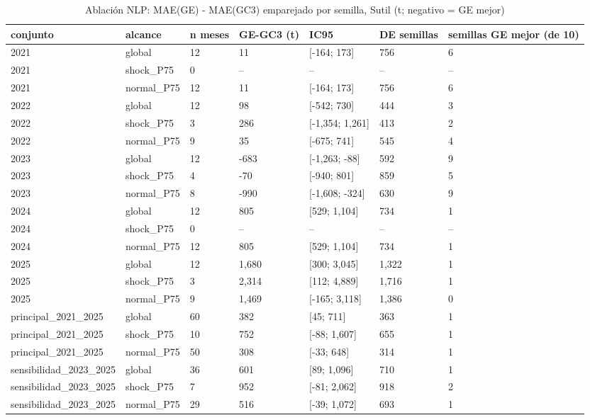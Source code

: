 \begin{table}[H]
\centering
\small
\caption{Ablación NLP: MAE(GE) - MAE(GC3) emparejado por semilla, Sutil (t; negativo = GE mejor)}
\label{tab:T11_ablacion_sutil}
\begin{tabular}{lllllll}
\toprule
conjunto & alcance & n meses & GE-GC3 (t) & IC95 & DE semillas & semillas GE mejor (de 10) \\
\midrule
2021 & global & 12 & 11 & [-164; 173] & 756 & 6 \\
2021 & shock\_P75 & 0 & -- & -- & -- & -- \\
2021 & normal\_P75 & 12 & 11 & [-164; 173] & 756 & 6 \\
2022 & global & 12 & 98 & [-542; 730] & 444 & 3 \\
2022 & shock\_P75 & 3 & 286 & [-1,354; 1,261] & 413 & 2 \\
2022 & normal\_P75 & 9 & 35 & [-675; 741] & 545 & 4 \\
2023 & global & 12 & -683 & [-1,263; -88] & 592 & 9 \\
2023 & shock\_P75 & 4 & -70 & [-940; 801] & 859 & 5 \\
2023 & normal\_P75 & 8 & -990 & [-1,608; -324] & 630 & 9 \\
2024 & global & 12 & 805 & [529; 1,104] & 734 & 1 \\
2024 & shock\_P75 & 0 & -- & -- & -- & -- \\
2024 & normal\_P75 & 12 & 805 & [529; 1,104] & 734 & 1 \\
2025 & global & 12 & 1,680 & [300; 3,045] & 1,322 & 1 \\
2025 & shock\_P75 & 3 & 2,314 & [112; 4,889] & 1,716 & 1 \\
2025 & normal\_P75 & 9 & 1,469 & [-165; 3,118] & 1,386 & 0 \\
principal\_2021\_2025 & global & 60 & 382 & [45; 711] & 363 & 1 \\
principal\_2021\_2025 & shock\_P75 & 10 & 752 & [-88; 1,607] & 655 & 1 \\
principal\_2021\_2025 & normal\_P75 & 50 & 308 & [-33; 648] & 314 & 1 \\
sensibilidad\_2023\_2025 & global & 36 & 601 & [89; 1,096] & 710 & 1 \\
sensibilidad\_2023\_2025 & shock\_P75 & 7 & 952 & [-81; 2,062] & 918 & 2 \\
sensibilidad\_2023\_2025 & normal\_P75 & 29 & 516 & [-39; 1,072] & 693 & 1 \\
\bottomrule
\end{tabular}
\end{table}
